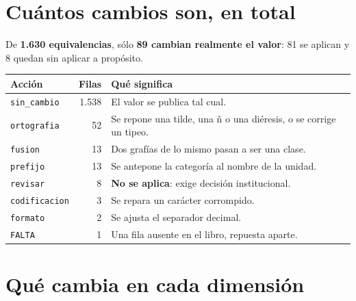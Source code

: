 \documentclass[11pt,a4paper]{report}
\newcommand{\orig}[1]{\texttt{\small #1}}
\begin{document}
\section{Cuántos cambios son, en total}

De \textbf{1.630 equivalencias}, sólo \textbf{89 cambian realmente el valor}:
81 se aplican y 8 quedan sin aplicar a propósito.

\begin{center}
\begin{tabular}{@{}lrL{7.4cm}@{}}
\toprule
\textbf{Acción} & \textbf{Filas} & \textbf{Qué significa}\\
\midrule
\orig{sin\_cambio} & 1.538 & El valor se publica tal cual.\\
\orig{ortografia} & 52 & Se repone una tilde, una ñ o una diéresis, o se corrige un tipeo.\\
\orig{fusion} & 13 & Dos grafías de lo mismo pasan a ser una clase.\\
\orig{prefijo} & 13 & Se antepone la categoría al nombre de la unidad.\\
 \orig{revisar} & 8 & \textbf{No se aplica}: exige decisión institucional.\\
\orig{codificacion} & 3 & Se repara un carácter corrompido.\\
\orig{formato} & 2 & Se ajusta el separador decimal.\\
 \orig{FALTA} & 1 & Una fila ausente en el libro, repuesta aparte.\\
\bottomrule
\end{tabular}
\end{center}

\section{Qué cambia en cada dimensión}
\end{document}
